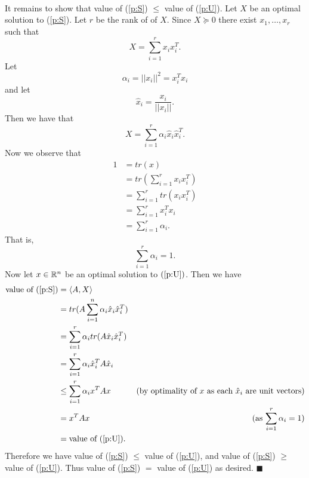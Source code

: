 \documentclass[letterpaper,12pt,oneside,onecolumn]{article}
\begin{document}
\paragraph{}
It remains to show that value of (\ref{p:S}) $\leq$ value of (\ref{p:U}). Let $X$ be an optimal solution to (\ref{p:S}). Let $r$ be the rank of of $X$. Since $X\succcurlyeq 0$ there exist $x_1, \dots, x_r$ such that
$$X = \sum_{i=1}^r x_i x_i^T.$$
Let $$\alpha_i = ||x_i||^2 = x_i^Tx_i$$
and let $$\hat{x}_i = \frac{x_i}{||x_i||}.$$
Then we have that
$$X = \sum_{i=1}^r \alpha_i \hat{x}_i\hat{x}_i^T.$$
Now we observe that
\begin{align*}
1 &= tr(x) \\
&= tr(\sum_{i=1}^r x_i x_i^T) \\
&=\sum_{i=1}^r tr(x_i x_i^T) \\
&= \sum_{i=1}^r x_i^T x_i \\
&= \sum_{i=1}^r \alpha_i.
\end{align*}
That is,
$$\sum_{i=1}^r \alpha_i = 1.$$
Now let $x \in \mathbb{R}^n$ be an optimal solution to $(\ref{p:U})$. Then we have
\begin{align*}
\text{value of (\ref{p:S})} &= \langle A,X \rangle \\
&= tr(A\sum_{i=1}^n \alpha_i \hat{x}_i\hat{x}_i^T) \\
&= \sum_{i=1}^r \alpha_i tr(A\hat{x}_i\hat{x}_i^T) \\
&= \sum_{i=1}^r \alpha_i \hat{x}_i^TA\hat{x}_i \\
&\leq \sum_{i=1}^r \alpha_i x^TAx &\text{(by optimality of $x$ as each $\hat{x}_i$ are unit vectors)} \\
&= x^TAx &\text{(as $\sum_{i=1}^r \alpha_i = 1$)} \\
&= \text{value of (\ref{p:U})}.
\end{align*}
Therefore we have value of (\ref{p:S}) $\leq$ value of (\ref{p:U}), and value of (\ref{p:S}) $\geq$ value of (\ref{p:U}). Thus value of (\ref{p:S}) $=$ value of (\ref{p:U}) as desired. $\blacksquare$
\end{document}
